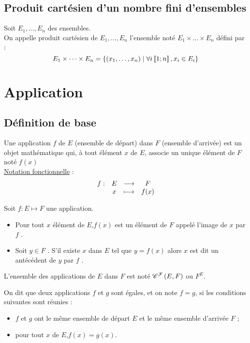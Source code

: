 \subsection{Produit cartésien d’un nombre fini d’ensembles}
\begin{defprop}
    Soit \(E_1, \dots, E_n\) des ensembles.\\
    On appelle produit cartésien de \(E_1, \dots, E_n\) l’ensemble noté \(E_1 \times \dots \times E_n\) défini par :
    \[E_1 \times \dots \times E_n = \left\lbrace\left(x_1,\dots,x_n\right) \;\middle|\; \forall i \left\llbracket1;n\right\rrbracket, x_i \in E_i\right\rbrace \]
\end{defprop}


\section{Application}

\subsection{Définition de base}
\begin{defprop}
    Une application \(f\) de \(E\) (ensemble de départ) dans \(F\) (ensemble d’arrivée) est un objet mathématique qui, à tout élément \(x\) de \(E\), associe un unique élément de \(F\) noté \(f (x)\) \\
    \underline{Notation fonctionnelle} : \[\begin{array}[t]{cccc}f : & E & \longrightarrow & F \\ & x & \longmapsto & f(x)\end{array}\]
\end{defprop}


\begin{defprop}
    Soit \(f : E \mapsto F\) une application.
    \begin{itemize}
        \item Pour tout \(x\) élément de \(E\),\( f (x)\) est un élément de \(F\) appelé l’image de \(x\) par \(f\) .
        \item Soit \(y \in F\) . S’il existe \(x\) dans \(E\) tel que \(y = f (x)\) alors \(x\) est dit un antécédent de \(y\) par \(f\) .
    \end{itemize}
\end{defprop}
\begin{defprop}
    L’ensemble des applications de \(E\) dans \(F\) est noté \(\mathscr{C}^{\mathcal{F}}\left(E,F\right)\) ou \(F^E\).
\end{defprop}
\begin{defprop}
    On dit que deux applications \(f\) et \(g\) sont égales, et on note \(f = g\), si les conditions suivantes sont réunies :
    \begin{itemize}
        \item \(f\) et \(g\) ont le même ensemble de départ \(E\) et le même ensemble d’arrivée \(F\) ;
        \item pour tout \(x\) de \(E\),\( f (x) = g(x)\).
    \end{itemize}
\end{defprop}

